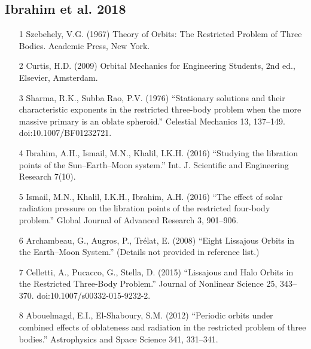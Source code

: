 \documentclass[12pt]{article}
\begin{document}
\subsection*{Ibrahim et al. 2018}
\begin{enumerate}
\item [1] Szebehely, V.G. (1967) Theory of Orbits: The Restricted Problem of Three Bodies. Academic Press, New York.
\item [2] Curtis, H.D. (2009) Orbital Mechanics for Engineering Students, 2nd ed., Elsevier, Amsterdam.
\item [3] Sharma, R.K., Subba Rao, P.V. (1976) ``Stationary solutions and their characteristic exponents in the restricted three-body problem when the more massive primary is an oblate spheroid.'' Celestial Mechanics 13, 137--149. doi:10.1007/BF01232721.
\item [4] Ibrahim, A.H., Ismail, M.N., Khalil, I.K.H. (2016) ``Studying the libration points of the Sun--Earth--Moon system.'' Int. J. Scientific and Engineering Research 7(10).
\item [5] Ismail, M.N., Khalil, I.K.H., Ibrahim, A.H. (2016) ``The effect of solar radiation pressure on the libration points of the restricted four-body problem.'' Global Journal of Advanced Research 3, 901--906.
\item [6] Archambeau, G., Augros, P., Trélat, E. (2008) ``Eight Lissajous Orbits in the Earth--Moon System.'' (Details not provided in reference list.)
\item [7] Celletti, A., Pucacco, G., Stella, D. (2015) ``Lissajous and Halo Orbits in the Restricted Three-Body Problem.'' Journal of Nonlinear Science 25, 343--370. doi:10.1007/s00332-015-9232-2.
\item [8] Abouelmagd, E.I., El-Shaboury, S.M. (2012) ``Periodic orbits under combined effects of oblateness and radiation in the restricted problem of three bodies.'' Astrophysics and Space Science 341, 331--341.
\end{enumerate}
\end{document}
